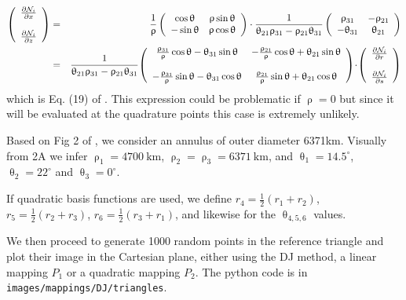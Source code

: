 \begin{eqnarray}
\left(
\begin{array}{c}    
\frac{\partial {\mathcal{N}}_i}{\partial x} \\ \\
\frac{\partial {\mathcal{N}}_i}{\partial z} 
\end{array}
\right)
&=&
\frac{1}{\uprho}
\left(
\begin{array}{cc}
\cos \uptheta & \uprho\sin\uptheta \\
-\sin\uptheta & \uprho\cos\uptheta
\end{array}
\right)\cdot
\frac{1}{\uptheta_{21}\uprho_{31}-\uprho_{21}\uptheta_{31}} 
\left(
\begin{array}{cc}
\uprho_{31} & -\uprho_{21} \\
-\uptheta_{31} & \uptheta_{21}
\end{array}
\right)
\nonumber\\
&=&
\frac{1}{\uptheta_{21}\uprho_{31}-\uprho_{21}\uptheta_{31}} \!
\left(
\begin{array}{cc}
 \frac{\uprho_{31} }{\uprho} \cos\uptheta -\uptheta_{31}\sin\uptheta &  
-\frac{\uprho_{21} }{\uprho} \cos\uptheta +\uptheta_{21}\sin\uptheta \\ \\
-\frac{\uprho_{31} }{\uprho} \sin\uptheta -\uptheta_{31}\cos\uptheta &
 \frac{\uprho_{21} }{\uprho} \sin\uptheta +\uptheta_{21}\cos\uptheta 
\end{array}
\right)
\!
\cdot
\!
\left(
\begin{array}{c}
\frac{\partial {\mathcal{N}}_i}{\partial r} \\ \\
\frac{\partial {\mathcal{N}}_i}{\partial s} 
\end{array}
\right)
\end{eqnarray}
which is Eq. (19) of \textcite{moth20}.
This expression could be problematic if $\uprho=0$ but since it will be evaluated at the 
quadrature points this case is extremely unlikely.


Based on Fig 2 of \textcite{moth20}, we consider an annulus of outer diameter
6371km. Visually from 2A we infer $\uprho_1=4700~\si{\km}$, $\uprho_2=\uprho_3=6371~\si{\km}$, and 
$\uptheta_1=14.5^\circ$, $\uptheta_2=22^\circ$ and $\uptheta_3=0^\circ$.

If quadratic basis functions are used, we define 
$r_4=\frac12(r_1+r_2)$,
$r_5=\frac12(r_2+r_3)$,
$r_6=\frac12(r_3+r_1)$, and likewise for the $\uptheta_{4,5,6}$ values.

We then proceed to generate 1000 random points in the reference triangle and plot their image
in the Cartesian plane, either using the DJ method, a linear mapping $P_1$ or a quadratic mapping $P_2$.
The python code is in {\tt images/mappings/DJ/triangles}.

